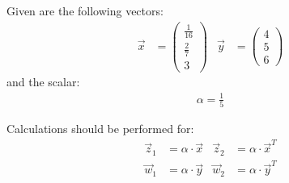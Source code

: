 Given are the following vectors:
\begin{align*}
	\vec{x}&=\begin{pmatrix}
		\frac{1}{16} \\ \frac{2}{7} \\ 3
	\end{pmatrix} &
	\vec{y}&=\begin{pmatrix}
		4 \\ 5 \\ 6
	\end{pmatrix}
\end{align*}
and the scalar:
\begin{align*}
	\alpha = \frac{1}{5}
\end{align*}

Calculations should be performed for:
\begin{align*}
	\vec{z}_1&=\alpha\cdot\vec{x} & \vec{z}_2&=\alpha\cdot\vec{x}^T \\
	\vec{w}_1&=\alpha\cdot\vec{y} & \vec{w}_2&=\alpha\cdot\vec{y}^T
\end{align*}

